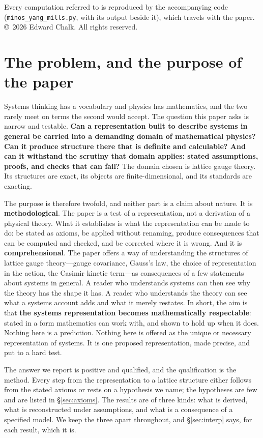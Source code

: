 \documentclass[11pt,a4paper]{article}
\theoremstyle{plain}
\theoremstyle{definition}
\theoremstyle{remark}
\begin{document}
\noindent\small Every computation referred to is reproduced by the accompanying code (\texttt{minos\_yang\_mills.py}, with its output beside it), which travels with the paper. \copyright\ 2026 Edward Chalk. All rights reserved.
\normalsize

\section{The problem, and the purpose of the paper}

Systems thinking has a vocabulary and physics has mathematics, and the two rarely meet on terms the second would accept. The question this paper asks is narrow and testable. \textbf{Can a representation built to describe systems in general be carried into a demanding domain of mathematical physics? Can it produce structure there that is definite and calculable? And can it withstand the scrutiny that domain applies: stated assumptions, proofs, and checks that can fail?} The domain chosen is lattice gauge theory. Its structures are exact, its objects are finite-dimensional, and its standards are exacting.

The purpose is therefore twofold, and neither part is a claim about nature. It is \textbf{methodological}. The paper is a test of a representation, not a derivation of a physical theory. What it establishes is what the representation can be made to do: be stated as axioms, be applied without renaming, produce consequences that can be computed and checked, and be corrected where it is wrong. And it is \textbf{comprehensional}. The paper offers a way of understanding the structures of lattice gauge theory---gauge covariance, Gauss's law, the choice of representation in the action, the Casimir kinetic term---as consequences of a few statements about systems in general. A reader who understands systems can then see why the theory has the shape it has. A reader who understands the theory can see what a systems account adds and what it merely restates. In short, the aim is that \textbf{the systems representation becomes mathematically respectable}: stated in a form mathematics can work with, and shown to hold up when it does. Nothing here is a prediction. Nothing here is offered as the unique or necessary representation of systems. It is one proposed representation, made precise, and put to a hard test.

The answer we report is positive and qualified, and the qualification is the method. Every step from the representation to a lattice structure either follows from the stated axioms or rests on a hypothesis we name; the hypotheses are few and are listed in \S\ref{sec:axioms}. The results are of three kinds: what is derived, what is reconstructed under assumptions, and what is a consequence of a specified model. We keep the three apart throughout, and \S\ref{sec:interp} says, for each result, which it is.
\end{document}
